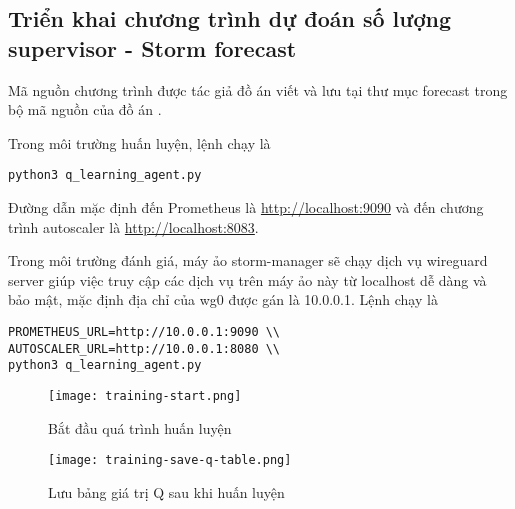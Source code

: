 \subsection{Triển khai chương trình dự đoán số lượng supervisor - Storm forecast}

Mã nguồn chương trình được tác giả đồ án viết và lưu tại thư mục forecast trong bộ mã nguồn của đồ án \autocite{lemionday_thesis_storm}.

Trong môi trường huấn luyện, lệnh chạy là

\begin{verbatim}
python3 q_learning_agent.py 
\end{verbatim}

Đường dẫn mặc định đến Prometheus là \href{http://localhost:9090}{http://localhost:9090} và đến chương trình autoscaler là \href{http://localhost:8083}{http://localhost:8083}.

Trong môi trường đánh giá, máy ảo storm-manager sẽ chạy dịch vụ wireguard server giúp việc truy cập các dịch vụ trên máy ảo này từ localhost dễ dàng và bảo mật, mặc định địa chỉ của wg0 được gán là 10.0.0.1. Lệnh chạy là

\begin{verbatim}
PROMETHEUS_URL=http://10.0.0.1:9090 \\
AUTOSCALER_URL=http://10.0.0.1:8080 \\
python3 q_learning_agent.py
\end{verbatim}

\begin{figure}[H]
    \centering
    \texttt{[image: training-start.png]}
    \caption{Bắt đầu quá trình huấn luyện}
\end{figure}

\begin{figure}[H]
    \centering
    \texttt{[image: training-save-q-table.png]}
    \caption{Lưu bảng giá trị Q sau khi huấn luyện}
\end{figure}




